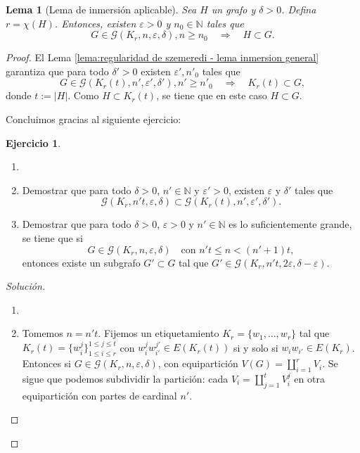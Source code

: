 \documentclass[12pt]{report}
\theoremstyle{plain}
\newtheorem{lemma}[theorem]{Lema}
\theoremstyle{definition}
\newtheorem{exercise}[theorem]{Ejercicio}
\newenvironment{solution}{\begin{proof}[Solución]}{\end{proof}}
\newcommand{\naturals}{\mathbb{N}}
\newcommand{\abs}[1]{\left \vert #1 \right \vert}
\begin{document}
\begin{lemma}[Lema de inmersión aplicable]\label{lema:regularidad de szemeredi - lema inmersion aplicable}
Sea $H$ un grafo y $\delta >0$. Defina $r = \chi (H)$. Entonces, existen $\varepsilon > 0$ y $n_0 \in \naturals$ tales que
\[
    G \in \mathcal G (K_r , n , \varepsilon, \delta), n \geq n_0 \quad \Rightarrow \quad H \subset G.
\]
\end{lemma}
\begin{proof}
El Lema \ref{lema:regularidad de szemeredi - lema inmersion general} garantiza que para todo $\delta ' > 0$ existen $\varepsilon ', n'_0$ tales que
\[
    G \in \mathcal G (K_r (t), n' , \varepsilon ' , \delta '), n' \geq n'_0 \quad \Rightarrow \quad K_r (t) \subset G,
\]
donde $t := \abs H$. Como $H \subset K_r (t)$, se tiene que en este caso $H \subset G$.

Concluimos gracias al siguiente ejercicio:
\begin{exercise}
\begin{enumerate}[(1)]
\item[]
\item Demostrar que para todo $\delta > 0$, $n' \in \naturals$ y $\varepsilon ' > 0$, existen $\varepsilon$ y $\delta'$ tales que
\[
    \mathcal G (K_r, n' t , \varepsilon, \delta) \subset \mathcal G (K_r (t), n', \varepsilon ', \delta ').
\]
\item Demostrar que para todo $\delta > 0$, $\varepsilon > 0$ y $n' \in \naturals$ es lo suficientemente grande, se tiene que si
\[
    G \in \mathcal G (K_r, n , \varepsilon, \delta) \quad \text{con } n't \leq n < (n'+1)t,
\]
entonces existe un subgrafo $G' \subset G$ tal que $G' \in \mathcal G (K_r, n't, 2\varepsilon, \delta - \varepsilon)$.
\end{enumerate}
\end{exercise}
\begin{solution}
\begin{enumerate}[(1)]
\item[]
\item Tomemos $n = n' t$. Fijemos un etiquetamiento $K_r = \{w_1, \ldots, w_r\}$ tal que $K_r (t) = \{w_i^j\}_{1 \leq i \leq r}^{1 \leq j \leq t}$ con $w_i^j w_{i'}^{j'} \in E(K_r (t))$ si y solo si $w_i w_{i'} \in E(K_r)$. Entonces si $G \in \mathcal G (K_r , n, \varepsilon, \delta)$, con equipartición $V(G) = \coprod_{i = 1}^r V_i$. Se sigue que podemos subdividir la partición: cada $V_i = \coprod_{j = 1}^t V_i^j$ en otra equipartición con partes de cardinal $n'$.


\end{enumerate}
\end{solution}
\end{proof}
\end{document}
